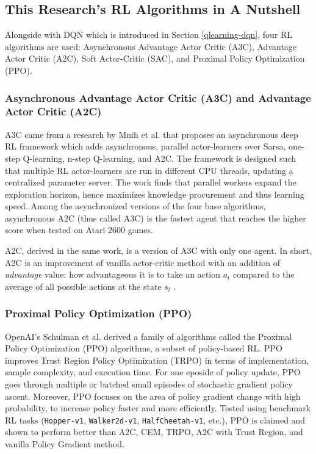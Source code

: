 \subsection{This Research's RL Algorithms in A Nutshell}
Alongside with DQN which is introduced in Section \ref{qlearning-dqn}, four RL algorithms are used: Asynchronous Advantage Actor Critic (A3C), Advantage Actor Critic (A2C), Soft Actor-Critic (SAC), and Proximal Policy Optimization (PPO).

\subsubsection{Asynchronous Advantage Actor Critic (A3C) and Advantage Actor Critic (A2C)}
A3C came from a research by Mnih et al. \cite{RL103} that proposes an asynchronous deep RL framework which adds asynchronous, parallel actor-learners over Sarsa, one-step Q-learning, n-step Q-learning, and A2C. The framework is designed such that multiple RL actor-learners are run in different CPU threads, updating a centralized parameter server. The work finds that parallel workers expand the exploration horizon, hence maximizes knowledge procurement and thus learning speed. Among the asynchronized versions of the four base algorithms, asynchronous A2C (thus called A3C) is the fastest agent that reaches the higher score when tested on Atari 2600 games.

A2C, derived in the same work, is a version of A3C with only one agent. In short, A2C is an improvement of vanilla actor-critic method with an addition of \textit{advantage} value: how advantageous it is to take an action $a_t$ compared to the average of all possible actions at the state $s_t$ \cite{RL103W}.

\subsubsection{Proximal Policy Optimization (PPO)}
OpenAI's Schulman et al. \cite{RL102} derived a family of algorithms called the Proximal Policy Optimization (PPO) algorithms, a subset of policy-based RL. PPO improves Trust Region Policy Optimization (TRPO) in terms of implementation, sample complexity, and execution time. For one eposide of policy update, PPO goes through multiple or batched small episodes of stochastic gradient policy ascent. Moreover, PPO focuses on the area of policy gradient change with high probability, to increase policy faster and more efficiently. Tested using benchmark RL tasks (\texttt{Hopper-v1}, \texttt{Walker2d-v1}, \texttt{HalfCheetah-v1}, etc.), PPO is claimed and shown to perform better than A2C, CEM, TRPO, A2C with Trust Region, and vanilla Policy Gradient method.

